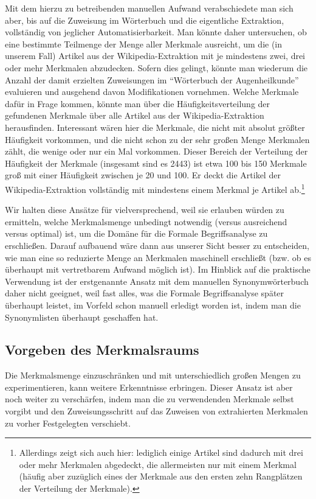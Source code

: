 \documentclass[pagesize,paper=A4,DIV=calc,fontsize=12pt,draft=false]{scrreprt}
\begin{document}
Mit dem hierzu zu betreibenden manuellen Aufwand verabschiedete man sich aber, bis auf die Zuweisung im Wörterbuch und die eigentliche Extraktion, vollständig von jeglicher Automatisierbarkeit.
Man könnte daher untersuchen, ob eine bestimmte Teilmenge der Menge aller Merkmale ausreicht, um die (in unserem Fall) Artikel aus der Wikipedia-Extraktion mit je mindestens zwei, drei oder mehr Merkmalen abzudecken.
Sofern dies gelingt, könnte man wiederum die Anzahl der damit erzielten Zuweisungen im \enquote{Wörterbuch der Augenheilkunde} evaluieren und ausgehend davon Modifikationen vornehmen.
Welche Merkmale dafür in Frage kommen, könnte man über die Häufigkeitsverteilung der gefundenen Merkmale über alle Artikel aus der Wikipedia-Extraktion herausfinden.
Interessant wären hier die Merkmale, die nicht mit absolut größter Häufigkeit vorkommen, und die nicht schon zu der sehr großen Menge Merkmalen zählt, die wenige oder nur ein Mal vorkommen.
Dieser Bereich der Verteilung der Häufigkeit der Merkmale (insgesamt sind es 2443) ist etwa 100 bis 150 Merkmale groß mit einer Häufigkeit zwischen je 20 und 100.
Er deckt die Artikel der Wikipedia-Extraktion vollständig mit mindestens einem Merkmal je Artikel ab.\footnote{Allerdings zeigt sich auch hier: lediglich einige Artikel sind dadurch mit drei oder mehr Merkmalen abgedeckt, die allermeisten nur mit einem Merkmal (häufig aber zuzüglich eines der Merkmale aus den ersten zehn Rangplätzen der Verteilung der Merkmale).}

Wir halten diese Ansätze für vielversprechend, weil sie erlauben würden zu ermitteln, welche Merkmalsmenge unbedingt notwendig (versus ausreichend versus optimal) ist, um die Domäne für die Formale Begriffsanalyse zu erschließen.
Darauf aufbauend wäre dann aus unserer Sicht besser zu entscheiden, wie man eine so reduzierte Menge an Merkmalen maschinell erschließt (bzw. ob es überhaupt mit vertretbarem Aufwand möglich ist).
Im Hinblick auf die praktische Verwendung ist der erstgenannte Ansatz mit dem manuellen Synonymwörterbuch daher nicht geeignet, weil fast alles, was die Formale Begriffsanalyse später überhaupt leistet, im Vorfeld schon manuell erledigt worden ist, indem man die Synonymlisten überhaupt geschaffen hat.

\subsection{Vorgeben des Merkmalsraums}

Die Merkmalsmenge einzuschränken und mit unterschiedlich großen Mengen zu experimentieren, kann weitere Erkenntnisse erbringen.
Dieser Ansatz ist aber noch weiter zu verschärfen, indem man die zu verwendenden Merkmale selbst vorgibt und den Zuweisungsschritt auf das Zuweisen von extrahierten Merkmalen zu vorher Festgelegten verschiebt.
\end{document}
